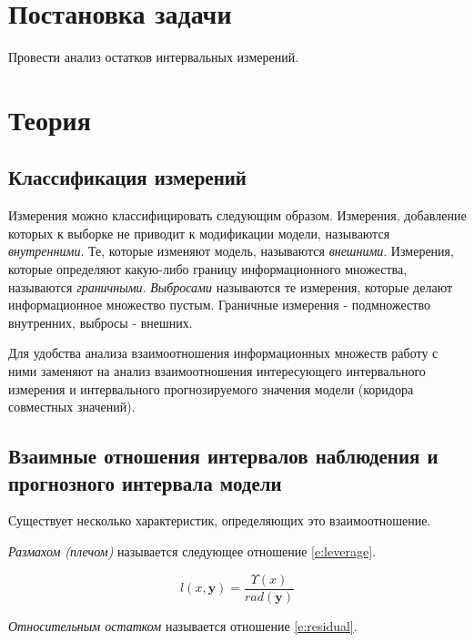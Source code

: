 \documentclass[a4paper,12pt]{article}
\begin{document}
    
    \newpage

    \tableofcontents

    \listoffigures
    
    \newpage

    \section{Постановка задачи}
    \quad Провести анализ остатков интервальных измерений.
    
    \section{Теория}
    \subsection{Классификация измерений}
    \quad Измерения можно классифицировать следующим образом.
    Измерения, добавление которых к выборке не приводит к модификации модели, называются \textsl{внутренними}.
    Те, которые изменяют модель, называются \textsl{внешними}.
    Измерения, которые определяют какую-либо границу информационного множества, называются \textsl{граничными}.
    \textsl{Выбросами} называются те измерения, которые делают информационное множество пустым.
    Граничные измерения - подмножество внутренних, выбросы - внешних.

    Для удобства анализа взаимоотношения информационных множеств работу с ними заменяют
    на анализ взаимоотношения интересующего интервального измерения и интервального прогнозируемого
    значения модели (коридора совместных значений).

    \subsection{Взаимные отношения интервалов наблюдения и прогнозного интервала модели}
    \quad Существует несколько характеристик, определяющих это взаимоотношение.

    \textsl{Размахом (плечом)} называется следующее отношение \ref{e:leverage}.
    
    \label{e:leverage}
    \begin{equation}
        l(x, \textbf{y}) = \frac{\Upsilon(x)}{rad(\textbf{y})}
    \end{equation}

    \textsl{Относительным остатком} называется отношение \ref{e:residual}.
    
\end{document}
